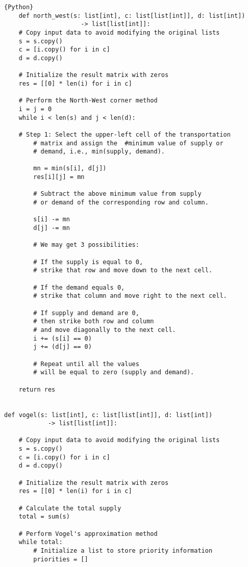 \documentclass[12pt, legalpaper]{exam}
\begin{document}
\begin{lstlisting}{Python}
    def north_west(s: list[int], c: list[list[int]], d: list[int])
                     -> list[list[int]]:
    # Copy input data to avoid modifying the original lists
    s = s.copy()
    c = [i.copy() for i in c]
    d = d.copy()

    # Initialize the result matrix with zeros
    res = [[0] * len(i) for i in c]

    # Perform the North-West corner method
    i = j = 0
    while i < len(s) and j < len(d):
        
    # Step 1: Select the upper-left cell of the transportation
        # matrix and assign the  #minimum value of supply or
        # demand, i.e., min(supply, demand).

        mn = min(s[i], d[j])
        res[i][j] = mn
        
        # Subtract the above minimum value from supply 
        # or demand of the corresponding row and column.
        
        s[i] -= mn
        d[j] -= mn
        
        # We may get 3 possibilities:
        
        # If the supply is equal to 0, 
        # strike that row and move down to the next cell.
        
        # If the demand equals 0,
        # strike that column and move right to the next cell.

        # If supply and demand are 0, 
        # then strike both row and column 
        # and move diagonally to the next cell.
        i += (s[i] == 0)
        j += (d[j] == 0)
        
        # Repeat until all the values
        # will be equal to zero (supply and demand).

    return res


def vogel(s: list[int], c: list[list[int]], d: list[int]) 
            -> list[list[int]]:

    # Copy input data to avoid modifying the original lists
    s = s.copy()
    c = [i.copy() for i in c]
    d = d.copy()

    # Initialize the result matrix with zeros
    res = [[0] * len(i) for i in c]

    # Calculate the total supply
    total = sum(s)

    # Perform Vogel's approximation method
    while total:
        # Initialize a list to store priority information
        priorities = []
        

\end{lstlisting}
\end{document}
